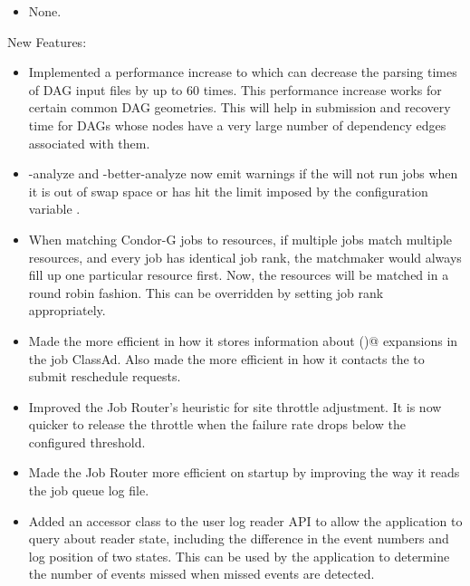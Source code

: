 \begin{itemize}

\item None.

\end{itemize}


\noindent New Features:

\begin{itemize}

\item Implemented a performance increase to  which can
decrease the parsing times of DAG input files by up to 60 times.
This performance increase works for certain common DAG geometries.
This will help in submission and recovery
time for DAGs whose nodes have a very large number of dependency edges
associated with them.

\item {} -analyze and -better-analyze now emit warnings
if the  will not run jobs when it is out of swap space or
has hit the limit imposed by the configuration variable
.

\item When matching Condor-G jobs to resources, if multiple jobs
match multiple resources, and every job has identical job rank, the
matchmaker would always fill up one particular resource first.  Now,
the resources will be matched in a round robin fashion.  This can be
overridden by setting job rank appropriately.

\item Made the  more efficient in how it stores
information about \verb@$$()@ expansions in the job ClassAd.
Also made the  more efficient in how it contacts
the  to submit reschedule requests.

\item Improved the Job Router's heuristic for site throttle adjustment.  It
is now quicker to release the throttle when the failure rate drops
below the configured threshold.

\item Made the Job Router more efficient on startup by improving the way it
reads the job queue log file.

\item Added an accessor class to the user log reader API to allow the
  application to query about reader state, including the
  difference in the event numbers and log position of two states.  This
  can be used by the application to determine the number of events
  missed when missed events are detected.


\end{itemize}
